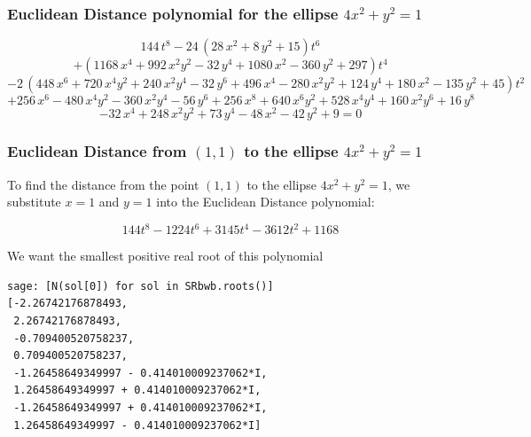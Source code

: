 \documentclass{beamer}
\begin{document}
\begin{frame}
\frametitle{Euclidean Distance polynomial for the ellipse $4x^2 + y^2 = 1$}
\scriptsize
\[ 144 \, t^{8} - 24 \, {\left(28 \, x^{2} + 8 \, y^{2} + 15\right)} t^{6} \]
\[ + {\left(1168 \, x^{4} + 992 \, x^{2} y^{2} - 32 \, y^{4} + 1080 \, x^{2} - 360 \, y^{2} + 297\right)} t^{4} \]
\[ - 2 \, {\left(448 \, x^{6} + 720 \, x^{4} y^{2} + 240 \, x^{2} y^{4} - 32 \, y^{6} + 496 \, x^{4} - 280 \, x^{2} y^{2} + 124 \, y^{4} + 180 \, x^{2} - 135 \, y^{2} + 45\right)} t^{2} \]
\[ + 256 \, x^{6} - 480 \, x^{4} y^{2} - 360 \, x^{2} y^{4} - 56 \, y^{6} + 256 \, x^{8} + 640 \, x^{6} y^{2} + 528 \, x^{4} y^{4} + 160 \, x^{2} y^{6} + 16 \, y^{8} \]
\[ - 32 \, x^{4} + 248 \, x^{2} y^{2} + 73 \, y^{4} - 48 \, x^{2} - 42 \, y^{2} + 9 = 0 \]
\end{frame}

\begin{frame}[fragile]
\frametitle{Euclidean Distance from $(1,1)$ to the ellipse $4x^2 + y^2 = 1$}
To find the distance from the point $(1,1)$ to the ellipse $4x^2 + y^2 = 1$, we substitute $x=1$ and $y=1$ into
the Euclidean Distance polynomial:

\[ 144 t^{8} - 1224 t^{6} + 3145 t^{4} - 3612 t^{2} + 1168 \]

We want the smallest positive real root of this polynomial

\begin{verbatim}
sage: [N(sol[0]) for sol in SRbwb.roots()]                                                                                         
[-2.26742176878493,
 2.26742176878493,
 -0.709400520758237,
 0.709400520758237,
 -1.26458649349997 - 0.414010009237062*I,
 1.26458649349997 + 0.414010009237062*I,
 -1.26458649349997 + 0.414010009237062*I,
 1.26458649349997 - 0.414010009237062*I]
\end{verbatim}
\end{frame}
\end{document}
